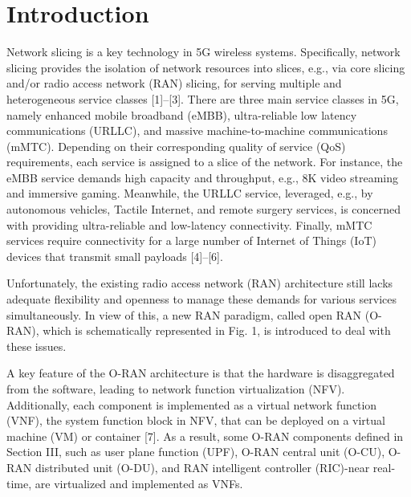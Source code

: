 \documentclass[12pt, letterpaper]{article}
\begin{document}
\section{Introduction}
Network slicing is a key technology in 5G wireless systems. Specifically, network slicing provides the isolation of network resources into slices, e.g., via core slicing and/or radio access network (RAN) slicing, for serving multiple and heterogeneous service classes [1]–[3]. There are three main service classes in 5G, namely enhanced mobile broadband (eMBB), ultra-reliable low latency communications (URLLC), and massive machine-to-machine communications (mMTC). Depending on their corresponding quality of service (QoS) requirements, each service is assigned to a slice of the network.
For instance, the eMBB service demands high capacity and throughput,  e.g., 8K video streaming and immersive gaming. Meanwhile, the URLLC service, leveraged, e.g., by autonomous vehicles, Tactile Internet, and remote surgery services, is concerned with providing ultra-reliable and low-latency connectivity. Finally, mMTC services require connectivity for a large number of Internet of Things (IoT) devices that transmit small payloads  [4]–[6].

Unfortunately, the existing radio access network (RAN) architecture still lacks adequate flexibility and openness to manage these demands for various services simultaneously. In view of this, a new RAN paradigm, called open RAN (O-RAN), which is schematically represented in Fig. 1, is introduced to deal with these issues.

A key feature of the O-RAN architecture is that the hardware is disaggregated from the software, leading to network function virtualization (NFV). Additionally, each component is implemented as a virtual network function (VNF), the system function block in NFV, that can be deployed on a virtual machine (VM) or container [7].
As a result, some O-RAN components defined in Section III, such as user plane function (UPF), O-RAN central unit (O-CU), O-RAN distributed unit (O-DU), and RAN intelligent controller (RIC)-near real-time, are virtualized and implemented as VNFs.
\end{document}
